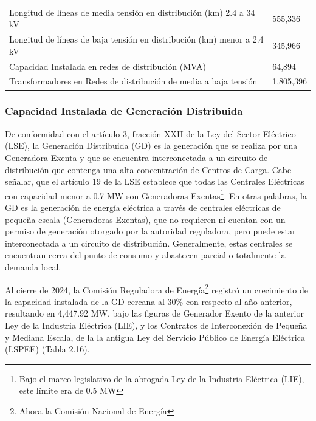 \documentclass{sener2025}
\begin{document}
\begin{tabladoradoCorto}
  \caption{Tabla 2.15. Características de las líneas de distribución de las RGD, 2024}
  \label{tab:tabla_2_15__caracteristicas_de}
  \begin{tabularx}{\textwidth}{Vv}
    \toprule
      &  \\
    \midrule
    Longitud de líneas de media tensión en distribución (km) 2.4 a 34 kV & 555,336 \\
    Longitud de líneas de baja tensión en distribución (km) menor a 2.4 kV & 345,966 \\
    Capacidad Instalada en redes de distribución (MVA) & 64,894 \\
    Transformadores en Redes de distribución de media a baja tensión & 1,805,396 \\
    \bottomrule
  \end{tabularx}
\end{tabladoradoCorto}
\vspace{-4pt}



\subsubsection{Capacidad Instalada de Generación Distribuida}

De conformidad con el artículo 3, fracción XXII de la Ley del Sector Eléctrico (LSE), la Generación Distribuida (GD) es la generación que se realiza por una Generadora Exenta y que se encuentra interconectada a un circuito de distribución que contenga una alta concentración de Centros de Carga. Cabe señalar, que el artículo 19 de la LSE establece que todas las Centrales Eléctricas con capacidad menor a 0.7 MW son Generadoras Exentas\footnote{Bajo el marco legislativo de la abrogada Ley de la Industria Eléctrica (LIE), este límite era de 0.5 MW}. En otras palabras, la GD es la generación de energía eléctrica a través de centrales eléctricas de pequeña escala (Generadoras Exentas), que no requieren ni cuentan con un permiso de generación otorgado por la autoridad reguladora, pero puede estar interconectada a un circuito de distribución. Generalmente, estas centrales se encuentran cerca del punto de consumo y abastecen parcial o totalmente la demanda local.

Al cierre de 2024, la Comisión Reguladora de Energía\footnote{Ahora la Comisión Nacional de Energía} registró un crecimiento de la capacidad instalada de la GD cercana al 30\% con respecto al año anterior, resultando en 4,447.92 MW, bajo las figuras de Generador Exento de la anterior Ley de la Industria Eléctrica (LIE), y los Contratos de Interconexión de Pequeña y Mediana Escala, de la la antigua Ley del Servicio Público de Energía Eléctrica (LSPEE) (Tabla 2.16).
\end{document}
